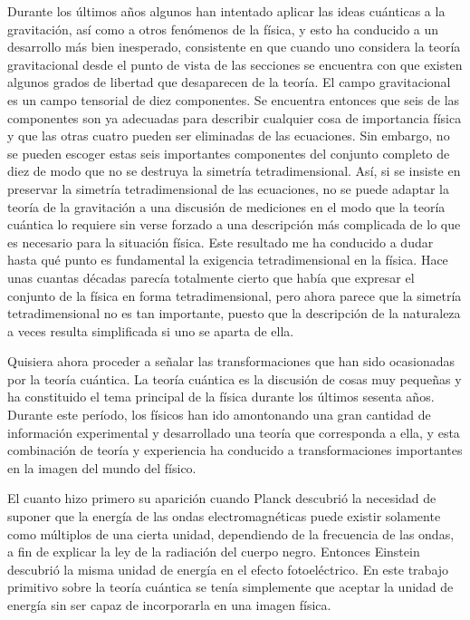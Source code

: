 \documentclass[a4paper, 12pt]{article}
\begin{document}
Durante los últimos años algunos han intentado aplicar las ideas cuánticas a la gravitación, así como a otros fenómenos de la física, y esto ha conducido a un desarrollo más bien inesperado, consistente en que cuando uno considera la teoría gravitacional desde el punto de vista de las secciones se encuentra con que existen algunos grados de libertad que desaparecen de la teoría. El campo gravitacional es un campo tensorial de diez componentes. Se encuentra entonces que seis de las componentes son ya adecuadas para describir cualquier cosa de importancia física y que las otras cuatro pueden ser eliminadas de las ecuaciones. Sin embargo, no se pueden escoger estas seis importantes componentes del conjunto completo de diez de modo que no se destruya la simetría tetradimensional. Así, si se insiste en preservar la simetría tetradimensional de las ecuaciones, no se puede adaptar la teoría de la gravitación a una discusión de mediciones en el modo que la teoría cuántica lo requiere sin verse forzado a una descripción más complicada de lo que es necesario para la situación física. Este resultado me ha conducido a dudar hasta qué punto es fundamental la exigencia tetradimensional en la física. Hace unas cuantas décadas parecía totalmente cierto que había que expresar el conjunto de la física en forma tetradimensional, pero ahora parece que la simetría tetradimensional no es tan importante, puesto que la descripción de la naturaleza a veces resulta simplificada si uno se aparta de ella.

Quisiera ahora proceder a señalar las transformaciones que han sido ocasionadas por la teoría cuántica. La teoría cuántica es la discusión de cosas muy pequeñas y ha constituido el tema principal de la física durante los últimos sesenta años. Durante este período, los físicos han ido amontonando una gran cantidad de información experimental y desarrollado una teoría que corresponda a ella, y esta combinación de teoría y experiencia ha conducido a transformaciones importantes en la imagen del mundo del físico.

El cuanto hizo primero su aparición cuando Planck descubrió la necesidad de suponer que la energía de las ondas electromagnéticas puede existir solamente como múltiplos de una cierta unidad, dependiendo de la frecuencia de las ondas, a fin de explicar la ley de la radiación del cuerpo negro. Entonces Einstein descubrió la misma unidad de energía en el efecto fotoeléctrico. En este trabajo primitivo sobre la teoría cuántica se tenía simplemente que aceptar la unidad de energía sin ser capaz de incorporarla en una imagen física.
\end{document}
